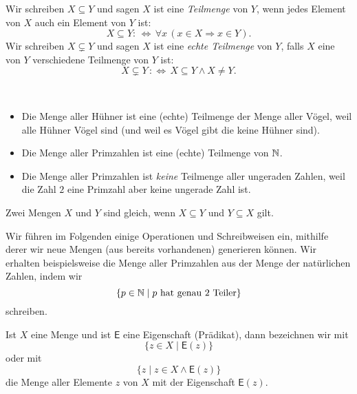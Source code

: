 \begin{df}[Teilmengen]
 Wir schreiben $X\subseteq Y$ und sagen $X$ ist eine \textit{Teilmenge} von $Y$, wenn jedes Element von $X$ auch ein Element von $Y$ ist:
\[
X\subseteq Y:\,\Leftrightarrow\,\forall x\,(x\in X\Rightarrow x\in Y).
\]
Wir schreiben $X\subsetneq Y$ und sagen $X$ ist eine \textit{echte Teilmenge} von $Y$, falls $X$ eine von $Y$ verschiedene Teilmenge von $Y$ ist:
\[
X\subsetneq Y\,:\Leftrightarrow\, X\subseteq Y\land X\neq Y.
\]
\end{df}

\begin{bsp}~
\begin{itemize}
\item Die Menge aller Hühner ist eine (echte) Teilmenge der Menge aller Vögel, weil alle Hühner Vögel sind (und weil es Vögel gibt die keine Hühner sind).
\item Die Menge aller Primzahlen ist eine (echte) Teilmenge von $\mathbb{N}$.
\item Die Menge aller Primzahlen ist \textit{keine} Teilmenge aller ungeraden Zahlen, weil die Zahl $2$ eine Primzahl aber keine ungerade Zahl ist.
\end{itemize}
\end{bsp}


\begin{rk}
Zwei Mengen $X$ und $Y$ sind gleich, wenn $X\subseteq Y$ und $Y\subseteq X$ gilt.
\end{rk}




Wir führen im Folgenden einige Operationen und Schreibweisen ein, mithilfe derer wir neue Mengen (aus bereits vorhandenen) generieren können.
Wir erhalten beispielsweise die Menge aller Primzahlen aus der Menge der natürlichen Zahlen, indem wir
\[
\{p\in\mathbb{N}\mid p\text{ hat genau $2$ Teiler}\}
\]
schreiben.

\begin{df}
Ist $X$ eine Menge und ist $\mathsf{E}$ eine Eigenschaft (Prädikat), dann bezeichnen wir mit
\[
\big\{z\in X\mid \mathsf{E}(z)\big\}
\]
oder mit
\[
\big\{z\mid z\in X\land\mathsf{E}(z)\big\}
\]
die Menge aller Elemente $z$ von $X$ mit der Eigenschaft $\mathsf{E}(z)$.
\end{df}


